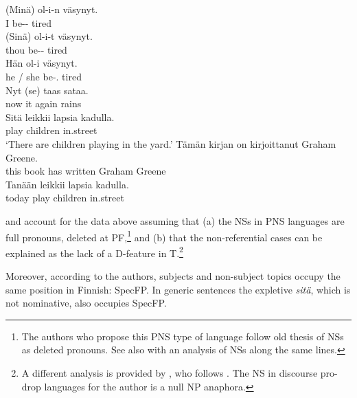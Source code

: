 \documentclass[output=paper]{langsci/langscibook}
\begin{document}
\ea%
    \label{ex:26.36}
    \ea
	\gll    (Minä) ol-i-n       väsynyt.\\
            \hphantom{(}I        be-\Pst-\Fsg{}   tired\\
    \ex
    \gll    (Sinä) ol-i-t           väsynyt.\\
            \hphantom{(}thou be-\Pst-\Ssg{}    tired\\
    \ex \gll    Hän ol-i väsynyt.\\
    {he / she} be-\Pst{}.\Tsg{} tired\\
    \ex
    \gll    Nyt (se) taas sataa.\\
    now \hphantom{(}it again rains\\
    \ex
    \gll	Sitä leikkii lapsia kadulla.\\
    \Expl{} play    children  in.street\\
    \glt
    \enquote*{There are children
    playing in the yard.}
    \z
\ex%
    \label{ex:26.37}
    \ea
	\gll	Tämän kirjan on kirjoittanut Graham Greene.\\
			this      book has  written      Graham Greene\\
    \ex
	\gll	Tanään   leikkii  lapsia     kadulla.\\
			today    play    children  in.street\\
    \z
\z

\citet{HolmbergNayuduSheehan2009} and \citet{HolShee2010} account for the data
above assuming that (a) the NSs in \gls{PNS} languages are full pronouns, deleted at
    \gls{PF},\footnote{The authors who propose this
        \gls{PNS}
        type of language follow  old thesis of NSs as
        deleted pronouns.  See also \citet{Roberts2010c} with an analysis of
        NSs along the same lines.} and (b) that the non-referential cases can
        be explained as the lack of a D-feature in T.\footnote{A different
            analysis is provided by \citet{Barbosa2013}, who follows
            \citet{Tomioka2003}. The NS in discourse pro-drop languages for the
        author is a null NP anaphora.}

Moreover, according to the authors, subjects and non-subject topics occupy the
same position in Finnish: SpecFP. In generic sentences the expletive
\emph{sitä}, which is not nominative, also occupies SpecFP.
\end{document}
